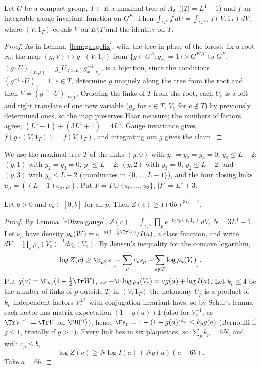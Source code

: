 \begin{lemma}\label{rDtwo:gauge}
Let $G$ be a compact group, $T\subset E$ a maximal tree of $\Lambda_L$
($\lvert T\rvert=L^4-1$) and $f$ an integrable gauge-invariant function on
$G^E$. Then $\int_{G^E}f\,dU=\int_{G^{E\setminus T}}f(V,1_T)\,dV$, where
$(V,1_T)$ equals $V$ on $E\setminus T$ and the identity on $T$.
\end{lemma}

\begin{proof}
As in Lemma~\ref{lem:gaugefix}, with the tree in place of the forest: fix a
root $x_0$; the map $(g,V)\mapsto g\cdot(V,1_T)$ from $\{g\in G^\Lambda:
g_{x_0}=1\}\times G^{E\setminus T}$ to $G^E$, $(g\cdot U)_{(x,\mu)}=g_xU_{(x,
\mu)}g_{x+e_\mu}^{-1}$, is a bijection, since the conditions $(g^{-1}\cdot
U)_e=1$, $e\in T$, determine $g$ uniquely along the tree from the root and
then $V=(g^{-1}\cdot U)\vert_{E\setminus T}$. Ordering the links of $T$ from
the root, each $U_e$ is a left and right translate of one new variable
($g_x$ for $e\in T$, $V_e$ for $e\notin T$) by previously determined ones,
so the map preserves Haar measure; the numbers of factors agree, $(L^4-1)+
(3L^4+1)=4L^4$. Gauge invariance gives $f(g\cdot(V,1_T))=f(V,1_T)$, and
integrating out $g$ gives the claim.
\end{proof}

We use the maximal tree $T$ of the links $(y,0)$ with $y_1=y_2=y_3=0$,
$y_0\le L-2$; $(y,1)$ with $y_2=y_3=0$, $y_1\le L-2$; $(y,2)$ with $y_3=0$,
$y_2\le L-2$; and $(y,3)$ with $y_3\le L-2$ (coordinates in $\{0,\dots,
L-1\}$), and the four closing links $u_\mu=((L-1)e_\mu,\mu)$. Put $F=T\cup
\{u_0,\dots,u_3\}$, $\lvert F\rvert=L^4+3$.

\begin{lemma}\label{rDtwo:jensen}
Let $b>0$ and $c_p\in[0,b]$ for all $p$. Then $Z(c)\ge I(6b)^{3L^4+1}$.
\end{lemma}

\begin{proof}
By Lemma~\ref{rDtwo:gauge}, $Z(c)=\int_{G^N}\prod_pe^{-c_ps_p(V,1_T)}\,dV$,
$N=3L^4+1$. Let $\nu_a$ have density $\rho_a(W)=e^{-a(1-\frac12\Tr W)}/I(a)$,
a class function, and write $dV=\prod_e\rho_a(V_e)^{-1}d\nu_a(V_e)$. By
Jensen's inequality for the concave logarithm,
\[
\log Z(c)\ge\E_{\nu_a^{\otimes N}}\Bigl[-\sum_pc_ps_p-\sum_{e\notin T}\log
\rho_a(V_e)\Bigr].
\]
Put $g(a)=\E_{\nu_a}(1-\frac12\Tr W)$, so $-\E\log\rho_a(V_e)=ag(a)+\log
I(a)$. Let $k_p\le4$ be the number of links of $p$ outside $T$; in $(V,1_T)$
the holonomy $U_p$ is a product of $k_p$ independent factors $V_e^{\pm1}$
with conjugation-invariant laws, so by Schur's lemma each factor has matrix
expectation $(1-g(a))\mathbf 1$ (also for $V_e^{-1}$, as $\Tr V^{-1}=\Tr V$ on
$\SU(2)$), hence $\E s_p=1-(1-g(a))^{k_p}\le k_pg(a)$ (Bernoulli if $g\le1$,
trivially if $g>1$). Every link lies in six plaquettes, so $\sum_pk_p=6N$,
and with $c_p\le b$,
\[
\log Z(c)\ge N\log I(a)+Ng(a)(a-6b).
\]
Take $a=6b$.
\end{proof}

